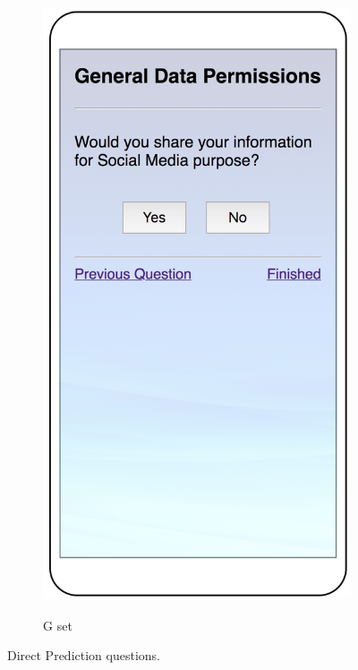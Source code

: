 \begin{figure}
\begin{subfigure}[b]{0.24\textheight}
		\includegraphics[width=0.24\textheight]{figures/direct4.png}
		\label{fig:directd}
		\caption{G set}
	\end{subfigure}
	\caption{Direct Prediction questions.}
	\label{fig:direct}
\end{figure}




